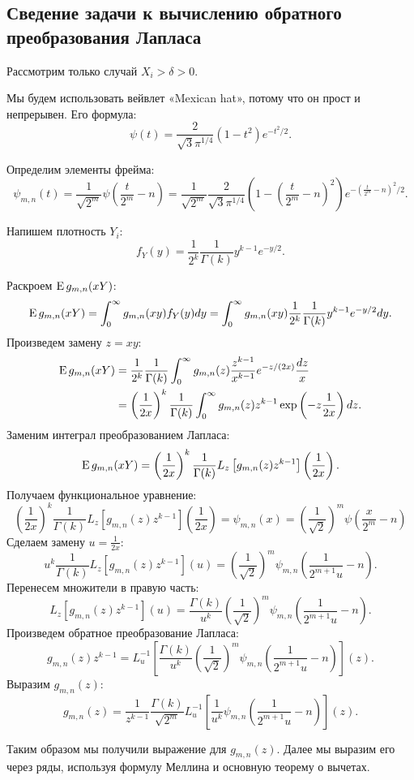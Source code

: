 \documentclass[../paper.tex]{subfiles}
\begin{document}
\subsection{Сведение задачи к вычислению обратного преобразования Лапласа}
Рассмотрим только случай $X_i > \delta > 0$.

Мы будем использовать вейвлет «Mexican hat», потому что он прост и непрерывен. Его формула:
\[
    \psi(t) = \frac{2}{\sqrt{3} \pi^{1 / 4}} (1-t^2)e^{-t^2 / 2}
.\]

Определим элементы фрейма: \\
\[
    \psi_{m,n}(t) = 
    \frac{1}{\sqrt{2^m}} \psi\left( \frac{t}{2^m}-n \right) =
    \frac{1}{\sqrt{2^m} }\frac{2}{\sqrt{3} \pi^{1 / 4}} \left(1-\left( \frac{t}{2^m} - n \right)^2 \right) e^{-\left( \frac{t}{2^m} - n \right)^2 / 2}
.\]


Напишем плотность $Y_i$:
\[
	f_Y(y) = \frac{1}{2^k} \frac{1}{\Gamma(k)} y^{k-1} e^{-y / 2}
.\]

Раскроем $\operatorname{E} g_{m,n}(xY)$:
\[
	\operatorname{E} g_{m,n}(xY)
	= \int_0^\infty g_{m,n}(xy) f_Y(y) dy
	= \int_0^\infty g_{m,n}(xy) \frac{1}{2^k} \frac{1}{\Gamma(k)} y^{k-1} e^{-y / 2} dy
.\]
Произведем замену $z = xy$:
\begin{align*}
	\operatorname{E} g_{m,n}(xY)
	&= \frac{1}{2^k}\frac{1}{\Gamma(k)} \int_0^\infty g_{m,n}(z) \frac{z^{k-1}}{x^{k-1}} e^{-z/(2x)} \frac{dz}{x}
	\\&= \left(\frac{1}{2x}\right)^k \frac{1}{\Gamma(k)} \int_0^\infty g_{m,n}(z) z^{k-1} \exp\left(-z \frac{1}{2x}\right) dz
.\end{align*}
%
Заменим интеграл преобразованием Лапласа:
\[
	\operatorname{E} g_{m,n}(xY)
	= \left( \frac{1}{2x} \right)^k \frac{1}{\Gamma(k)} L_z \left[g_{m,n}(z) z^{k-1}\right] \left( \frac{1}{2x} \right)
.\]
%
Получаем функциональное уравнение:
\[
	\left( \frac{1}{2x} \right)^k \frac{1}{\Gamma(k)} L_z \left[g_{m,n}(z) z^{k-1}\right] \left( \frac{1}{2x} \right)
	= \psi_{m,n}(x)
	= \left( \frac{1}{\sqrt{2} } \right)^m \psi \left( \frac{x}{2^m} - n \right) 
\]
%
Сделаем замену $u = \frac{1}{2x}$:
\[
    u^k \frac{1}{\Gamma(k)} L_z \left[g_{m,n}(z) z^{k-1}\right] \left( u \right)
    = \left( \frac{1}{\sqrt{2} } \right)^m \psi_{m,n} \left( \frac{1}{2^{m+1} u} - n \right) 
.\]
%
Перенесем множители в правую часть:
\[
    L_z \left[g_{m,n}(z) z^{k-1}\right] \left( u \right)
    = \frac{\Gamma(k)}{u^k} \left( \frac{1}{\sqrt{2} } \right)^m \psi_{m,n} \left( \frac{1}{2^{m+1} u} - n \right)
.\]
%
Произведем обратное преобразование Лапласа:
\[
    g_{m,n}(z) z^{k-1}
    = L^{-1}_u \left[ \frac{\Gamma(k)}{u^k} \left( \frac{1}{\sqrt{2} } \right)^m \psi_{m,n} \left( \frac{1}{2^{m+1} u} - n \right) \right] (z)
.\]
%
Выразим $g_{m,n}(z)$:
\[
    g_{m,n}(z)
    = \frac{1}{z^{k-1}} \frac{\Gamma(k)}{\sqrt{2^m}} L^{-1}_u \left[ \frac{1}{u^k} \psi_{m,n} \left( \frac{1}{2^{m+1} u} - n \right) \right] (z)
.\]

Таким образом мы получили выражение для $g_{m,n}(z)$. Далее мы выразим его через ряды, используя формулу Меллина и основную теорему о вычетах.
\end{document}
